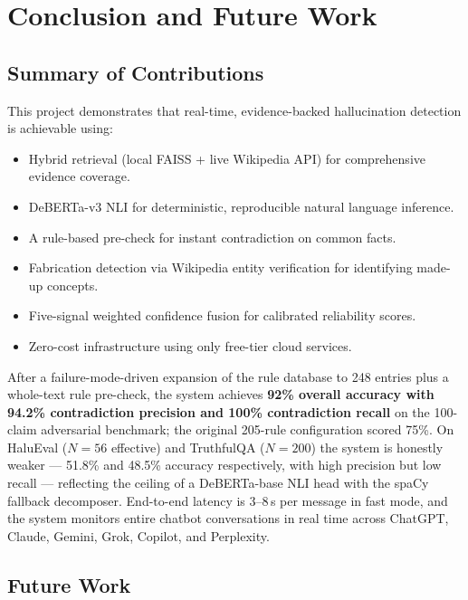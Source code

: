 \documentclass[12pt, a4paper, oneside]{report}
\begin{document}
\chapter{Conclusion and Future Work}
\label{ch:conclusion}

\section{Summary of Contributions}

This project demonstrates that real-time, evidence-backed hallucination detection is achievable using:
\begin{itemize}[nosep]
    \item Hybrid retrieval (local FAISS + live Wikipedia API) for comprehensive evidence coverage.
    \item DeBERTa-v3 NLI for deterministic, reproducible natural language inference.
    \item A rule-based pre-check for instant contradiction on common facts.
    \item Fabrication detection via Wikipedia entity verification for identifying made-up concepts.
    \item Five-signal weighted confidence fusion for calibrated reliability scores.
    \item Zero-cost infrastructure using only free-tier cloud services.
\end{itemize}

After a failure-mode-driven expansion of the rule database to 248 entries plus a whole-text rule pre-check, the system achieves \textbf{92\% overall accuracy with 94.2\% contradiction precision and 100\% contradiction recall} on the 100-claim adversarial benchmark; the original 205-rule configuration scored 75\%. On HaluEval ($N{=}56$ effective) and TruthfulQA ($N{=}200$) the system is honestly weaker --- 51.8\% and 48.5\% accuracy respectively, with high precision but low recall --- reflecting the ceiling of a DeBERTa-base NLI head with the spaCy fallback decomposer. End-to-end latency is 3--8\,s per message in fast mode, and the system monitors entire chatbot conversations in real time across ChatGPT, Claude, Gemini, Grok, Copilot, and Perplexity.

\section{Future Work}
\end{document}
